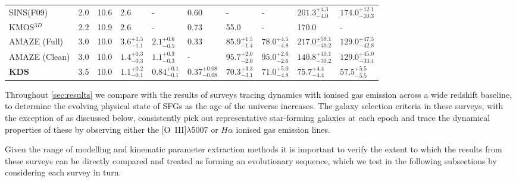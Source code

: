 \documentclass[fleqn,usenatbib]{mn2e}
\begin{document}
\begin{table*}
\begin{threeparttable}
\begin{tabular}{llllllllll}
 SINS(F09) & 2.0 & 10.6 & 2.6 & - & 0.60 & - & - & $201.3^{+4.3}_{-4.0}$ & $174.0^{+12.1}_{-10.3}$ \\[1ex]
 KMOS$^{3D}$ & 2.2 & 10.9 & 2.6 & - & 0.73 & 55.0 & - & 170.0 & - \\[1ex]
 AMAZE (Full) & 3.0 & 10.0 & $3.6^{+1.5}_{-1.1}$ & $2.1^{+0.6}_{-0.5}$ & 0.33 & $85.9^{+1.5}_{-1.4}$ & $78.0^{+4.5}_{-4.8}$ & $217.0^{+59.1}_{-40.2}$ & $129.0^{+47.5}_{-42.8}$ \\[1ex]
 AMAZE (Clean) & 3.0 & 10.0 & $1.4^{+0.3}_{-0.3}$ & $1.1^{+0.3}_{-0.3}$ & - & $95.7^{+2.0}_{-2.0}$ & $95.0^{+2.6}_{-2.6}$ & $140.8^{+40.1}_{-30.2}$ & $129.0^{+45.0}_{-33.4}$ \\[1ex]
 \textbf{KDS} & 3.5 & 10.0 & $1.1^{+0.2}_{-0.1}$ & $0.84^{+0.1}_{-0.1}$ & $0.37^{+0.08}_{-0.08}$ & $70.3^{+3.3}_{-3.1}$ & $71.0^{+5.0}_{-4.8}$ & $75.7^{+4.4}_{-4.4}$ & $57.5^{+5.5}_{-5.5}$ \\[1ex]
 \hline
\end{tabular}
  \end{threeparttable}
  \end{table*}

Throughout \cref{sec:results} we compare with the results of surveys tracing dynamics with ionised gas emission across a wide redshift baseline, to determine the evolving physical state of SFGs as the age of the universe increases.
The galaxy selection criteria in these surveys, with the exception of \cite{Green2014} as discussed below, consistently pick out representative star-forming galaxies at each epoch and trace the dynamical properties of these by observing either the [O~{\sc III}]$\lambda$5007 or $H\alpha$ ionised gas emission lines.

Given the range of modelling and kinematic parameter extraction methods it is important to verify the extent to which the results from these surveys can be directly compared and treated as forming an evolutionary sequence, which we test in the following subsections by considering each survey in turn.
\end{document}

